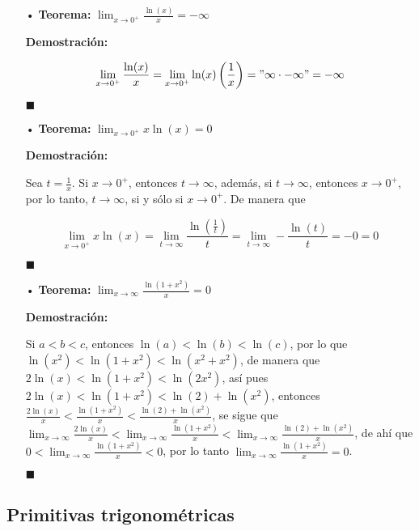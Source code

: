 \documentclass[pts12]{article}
\numberwithin{equation}{section}
\newcommand{\Col}{\color{ProcessBlue}}
\begin{document}
\begin{itemize}
\item[\Col •] \textbf{Teorema:} $\lim_{x\to 0^+}\frac{\ln(x)}{x}=-\infty$

\textbf{Demostración:} 

$$ \lim_{x\to 0^+}\frac{\ln(x)}{x}=\lim_{x\to 0^+}\ln(x)\left(\frac{1}{x}\right)="\infty\cdot-\infty"=-\infty $$

\begin{flushright}
$\blacksquare$
\end{flushright}

\item[\Col •] \textbf{Teorema:} $\lim_{x\to 0^+}x\ln(x)=0$

\textbf{Demostración:} 

Sea $t=\frac{1}{x}$. Si $x\to 0^+$, entonces $t\to\infty$, además, si $t\to\infty$, entonces $x\to 0^+$, por lo tanto, $t\to\infty$, si y sólo si $x\to 0^+$. De manera que

$$\lim_{x\to 0^+}x\ln(x)=\lim_{t\to\infty}\frac{\ln\left(\frac{1}{t}\right)}{t}=\lim_{t\to\infty}-\frac{\ln(t)}{t}=-0=0$$

\begin{flushright}
$\blacksquare$
\end{flushright}

\item[\Col •] \textbf{Teorema:} $\lim_{x\to\infty}\frac{\ln(1+x^2)}{x}=0$

\textbf{Demostración:}

Si $a<b<c$, entonces $\ln(a)<\ln(b)<\ln(c)$, por lo que $\ln(x^2)<\ln(1+x^2)<\ln(x^2+x^2)$, de manera que $2\ln(x)<\ln(1+x^2)<\ln(2x^2)$, así pues $2\ln(x)<\ln(1+x^2)<\ln(2)+\ln(x^2)$, entonces $\frac{2\ln(x)}{x}<\frac{\ln(1+x^2)}{x}<\frac{\ln(2)+\ln(x^2)}{x}$, se sigue que $\lim_{x\to\infty}\frac{2\ln(x)}{x}<\lim_{x\to\infty}\frac{\ln(1+x^2)}{x}<\lim_{x\to\infty}\frac{\ln(2)+\ln(x^2)}{x}$, de ahí que $0<\lim_{x\to\infty}\frac{\ln(1+x^2)}{x}<0$, por lo tanto $\lim_{x\to\infty}\frac{\ln(1+x^2)}{x}=0$.

\begin{flushright}
$\blacksquare$
\end{flushright}

\end{itemize}

\subsection{\Col Primitivas trigonométricas}
\end{document}
